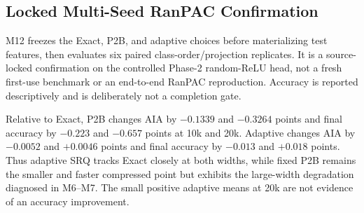 \documentclass[runningheads]{llncs}
\begin{document}
\subsection{Locked Multi-Seed RanPAC Confirmation}

M12 freezes the Exact, P2B, and adaptive choices before materializing test
features, then evaluates six paired class-order/projection replicates. It is a
source-locked confirmation on the controlled Phase-2 random-ReLU head, not a
fresh first-use benchmark or an end-to-end RanPAC reproduction. Accuracy is
reported descriptively and is deliberately not a completion gate.

\begin{table}
\caption{Locked CIFAR-100 test confirmation on the controlled RanPAC head.
Values are mean $\pm$ sample standard deviation over six paired replicates.
State reduction and update time are relative to Exact at the same width.}
\label{tab:m12-confirmation}
\centering
\small
{}
\end{table}

Relative to Exact, P2B changes AIA by $-0.1339$ and $-0.3264$ points and
final accuracy by $-0.223$ and $-0.657$ points at 10k and 20k. Adaptive changes
AIA by $-0.0052$ and $+0.0046$ points and final accuracy by $-0.013$ and
$+0.018$ points. Thus adaptive SRQ tracks Exact closely at both widths, while
fixed P2B remains the smaller and faster compressed point but exhibits the
large-width degradation diagnosed in M6--M7. The small positive adaptive means
at 20k are not evidence of an accuracy improvement.
\end{document}
